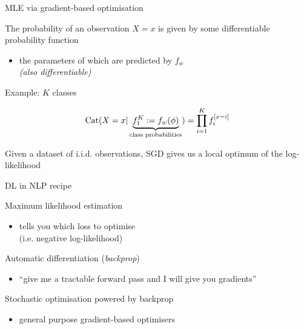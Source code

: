 \documentclass[14pt]{beamer}
\begin{document}
\begin{frame}{MLE via gradient-based optimisation}

The probability of an observation $X=x$ is given by some \alert{differentiable} probability function
\begin{itemize}
	\item the parameters of which are predicted by $f_w$\\
	\emph{(also differentiable)}
\end{itemize}
\pause
Example: $K$ classes
\begin{small}
\begin{equation*}
\operatorname{Cat}(X=x|\underbrace{f_1^K := f_w(\phi)}_{\text{class probabilities}}) = \prod_{i=1}^K f_i^{[x=i]} 
\end{equation*}
\end{small}

\pause
Given a dataset of i.i.d. observations, SGD gives us a local optimum of the log-likelihood %


\end{frame}



\begin{frame}{DL in NLP recipe}



	Maximum likelihood estimation
	\begin{itemize}
		\item  tells you which \alert{loss} to optimise \\
		(i.e. negative log-likelihood)
	\end{itemize}
	
	Automatic differentiation (\emph{backprop})
	\begin{itemize}
		\item ``give me a tractable forward pass and I will give you \alert{gradients}''
	\end{itemize}
	
	Stochastic optimisation powered by backprop
	\begin{itemize}
		\item general purpose gradient-based optimisers
	\end{itemize}

\end{frame}
\end{document}
